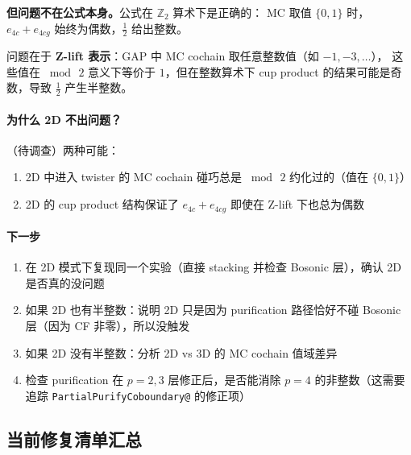\documentclass[a4paper,fontset=ubuntu,12pt]{ctexart}
\begin{document}
\textbf{但问题不在公式本身。}公式在 $\mathbb{Z}_2$ 算术下是正确的：
MC 取值 $\{0,1\}$ 时，$e_{4c} + e_{4cg}$ 始终为偶数，$\frac{1}{2}$ 给出整数。

问题在于 \textbf{Z-lift 表示}：GAP 中 MC cochain 取任意整数值（如 $-1, -3, \ldots$），
这些值在 $\bmod\,2$ 意义下等价于 $1$，但在整数算术下
cup product 的结果可能是奇数，导致 $\frac{1}{2}$ 产生半整数。

\paragraph{为什么 2D 不出问题？}

（待调查）两种可能：
\begin{enumerate}
\item 2D 中进入 twister 的 MC cochain 碰巧总是 $\bmod\,2$ 约化过的（值在 $\{0,1\}$）
\item 2D 的 cup product 结构保证了 $e_{4c}+e_{4cg}$ 即使在 Z-lift 下也总为偶数
\end{enumerate}

\paragraph{下一步}

\begin{enumerate}
\item 在 2D 模式下复现同一个实验（直接 stacking 并检查 Bosonic 层），确认 2D 是否真的没问题
\item 如果 2D 也有半整数：说明 2D 只是因为 purification 路径恰好不碰 Bosonic 层（因为 CF 非零），所以没触发
\item 如果 2D 没有半整数：分析 2D vs 3D 的 MC cochain 值域差异
\item 检查 purification 在 $p=2,3$ 层修正后，是否能消除 $p=4$ 的非整数（这需要追踪 \texttt{PartialPurifyCoboundary@} 的修正项）
\end{enumerate}

\subsection{当前修复清单汇总}
\label{sec:fix-summary}
\end{document}

